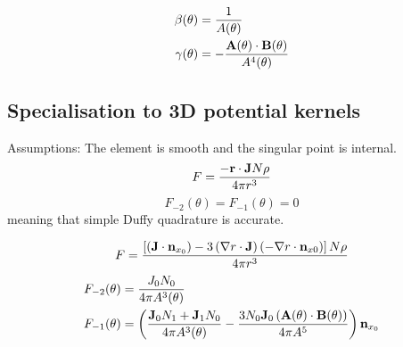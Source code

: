 \documentclass[a4paper,11pt]{article}
\begin{document}
\begin{align}
\beta(\theta) &= \frac{1}{A(\theta)} \\
\gamma(\theta) &= -\frac{{\bf A}(\theta) \cdot {\bf B}(\theta)}{A^4(\theta)}
\end{align}


\subsection{Specialisation to 3D potential kernels}

Assumptions: The element is smooth and the singular point is internal.
%
\begin{equation}
F = \frac{-{\bf r} \cdot {\bf J} N \rho}{4\pi r^3}
\end{equation}
%
\begin{equation}
F_{-2}(\theta) = F_{-1}(\theta) = 0
\end{equation}
%
meaning that simple Duffy quadrature is accurate.

\begin{equation}
F = \frac{
\left[
\left({\bf J} \cdot {\bf n}_{x_0}\right)
-
3 \left(\nabla r \cdot {\bf J}\right) \left(-\nabla r \cdot {\bf n}_{x0}\right)
\right] N \rho
}{
4\pi r^3
}
\end{equation}
%
\begin{align}
F_{-2}(\theta) &= \frac{J_0 N_0}{4\pi A^3(\theta)} \\
F_{-1}(\theta) &= \left(\frac{{\bf J}_0 N_1 + {\bf J}_1 N_0}{4\pi A^3(\theta)}
-\frac{3 N_0 {\bf J}_0 \left({\bf A}(\theta) \cdot {\bf B}(\theta)\right)}{4\pi A^5}\right) {\bf n}_{x_0}
\end{align}
\end{document}
